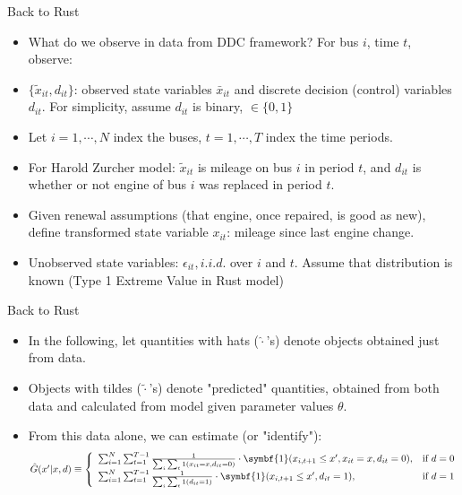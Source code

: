 \begin{frame}{Back to Rust}
\begin{itemize}
\item What do we observe in data from DDC framework? For bus $i$, time $t$, observe:
\item $\{ \tilde x_{it}, d_{it}\}$: observed state variables $\bar x_{it}$ and discrete decision (control) variables $d_{it}$. For simplicity, assume $d_{it}$ is binary, $\in \{0,1\}$
\item Let $i=1, \cdots , N$ index the buses, $t=1, \cdots, T$ index the time periods. 
\item For Harold Zurcher model: $\tilde x_{it}$ is mileage on bus $i$ in period $t$, and $d_{it}$ is whether or not engine of bus $i$ was replaced in period $t$. 
\item Given renewal assumptions (that engine, once repaired, is good as new), define transformed state variable $x_{it}$: mileage since last engine change. 
\item Unobserved state variables: $\epsilon_{it}, i.i.d.$ over $i$ and $t$. Assume that distribution is known (Type 1 Extreme Value in Rust model)
\end{itemize}
\end{frame}

\begin{frame}{Back to Rust}
\begin{itemize}
\item In the following, let quantities with hats ($\hat \cdot$'s) denote objects obtained just from data.
\item Objects with tildes ($\tilde \cdot $'s) denote "predicted" quantities, obtained from both data and calculated from model given parameter values $\theta$. 
\item  From this data alone, we can estimate (or "identify"):
\begin{equation*}
\resizebox{.9999999\hsize}{!}{$ \hat G (x' | x, d) \equiv \left \{
\begin{array}{lc} 
\sum^N_{i=1} \sum^{T-1}_{t=1} \frac{1}{\sum_i \sum_t 1 (x_{it} = x, d_{it} = 0)} \cdot \symbf{1} (x_{i, t+1} \leq x', x_{it} = x, d_{it} = 0), & \text{if } d = 0 \\
\sum^N_{i=1} \sum^{T-1}_{t=1} \frac{1}{\sum_i \sum_t 1 (d_{it}=1)} \cdot \symbf{1} (x_{i,t+1} \leq x', d_{it} = 1), & \text{if } d =1
\end{array}
\right . $}
\end{equation*}
\end{itemize}
\end{frame}

